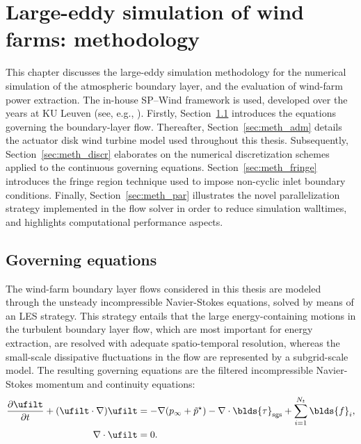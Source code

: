 \chapter{Large-eddy simulation of wind farms: methodology}\label{ch:methodology}


This chapter discusses the large-eddy simulation methodology for the numerical simulation of the atmospheric boundary layer, and the evaluation of wind-farm power extraction. The in-house SP--Wind framework is used, developed over the years at KU Leuven (see, e.g., \citealp{meyers2007evaluation, delport2009constrained, calaf2010large, goit2015optimal, allaerts2017boundary}). Firstly, Section~\ref{sec:meth_governing} introduces the equations governing the boundary-layer flow. Thereafter, Section~\ref{sec:meth_adm} details the actuator disk wind turbine model used throughout this thesis. Subsequently, Section~\ref{sec:meth_discr} elaborates on the numerical discretization schemes applied to the continuous governing equations. Section~\ref{sec:meth_fringe} introduces the fringe region technique used to impose non-cyclic inlet boundary conditions. Finally, Section~\ref{sec:meth_par} illustrates the novel parallelization strategy implemented in the flow solver in order to reduce simulation walltimes, and highlights computational performance aspects. 

\section{Governing equations}\label{sec:meth_governing}
The wind-farm boundary layer flows considered in this thesis are modeled through the unsteady incompressible Navier-Stokes equations, solved by means of an LES strategy. This strategy entails that the large energy-containing motions in the turbulent boundary layer flow, which are most important for energy extraction, are resolved with adequate spatio-temporal resolution, whereas the small-scale dissipative fluctuations in the flow are represented by a subgrid-scale model. The resulting governing equations are the filtered incompressible Navier-Stokes momentum and continuity equations: 
\begin{align}
	\frac{\partial \ufilt}{\partial t} + (\ufilt \cdot \nabla) \ufilt &= -\nabla (p_\infty + \tilde{p}^\star) - \nabla \cdot \blds{\tau}_{\text{sgs}} + \sum_{i=1}^{N_t} \blds{f}_i, \label{eq:NSmomentum}\\ 
 	\nabla \cdot \ufilt &= 0. \label{eq:NScontinuity}
\end{align}

